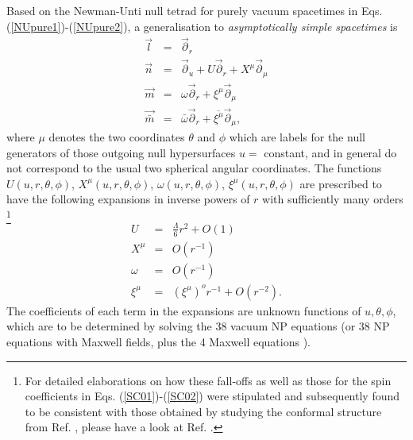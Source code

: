 \documentclass[aps,pre,preprint,superscriptaddress,showpacs,showkeys]{revtex4-1}
\begin{document}
Based on the Newman-Unti null tetrad for purely vacuum spacetimes in Eqs. (\ref{NUpure1})-(\ref{NUpure2}), a generalisation to \emph{asymptotically simple spacetimes} is \cite{Vee2016}
\begin{eqnarray}
\vec{l}&=&\vec{\partial}_r\label{NU1}\\
\vec{n}&=&\vec{\partial}_u+U\vec{\partial}_r+X^\mu\vec{\partial}_\mu\\
\vec{m}&=&\omega\vec{\partial}_r+\xi^\mu\vec{\partial}_\mu\\
\vec{\bar{m}}&=&\bar{\omega}\vec{\partial}_r+\overline{\xi^\mu}\vec{\partial}_\mu,\label{NU2}
\end{eqnarray}
where $\mu$ denotes the two coordinates $\theta$ and $\phi$ which are labels for the null generators of those outgoing null hypersurfaces $u=$ constant, and in general do not correspond to the usual two spherical angular coordinates. The functions $U(u,r,\theta,\phi)$, $X^\mu(u,r,\theta,\phi)$, $\omega(u,r,\theta,\phi)$, $\xi^\mu(u,r,\theta,\phi)$ are prescribed to have the following expansions in inverse powers of $r$ with sufficiently many orders \footnote{For detailed elaborations on how these fall-offs as well as those for the spin coefficients in Eqs. (\ref{SC01})-(\ref{SC02}) were stipulated and subsequently found to be consistent with those obtained by studying the conformal structure from Ref. \cite{Szabados}, please have a look at Ref. \cite{Vee2016}.}
\begin{eqnarray}
U&=&\frac{\Lambda}{6}r^2+O(1)\label{U}\\
X^\mu&=&O(r^{-1})\\
\omega&=&O(r^{-1})\\
\xi^\mu&=&(\xi^\mu)^or^{-1}+O(r^{-2}).\label{defxi}
\end{eqnarray}
The coefficients of each term in the expansions are unknown functions of $u,\theta,\phi$, which are to be determined by solving the 38 vacuum NP equations \cite{Vee2016} (or 38 NP equations with Maxwell fields, plus the 4 Maxwell equations \cite{Vee2017}).
\end{document}
